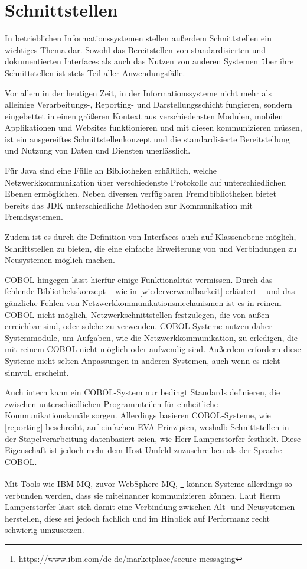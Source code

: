 \section{Schnittstellen}\label{schnittstellen}

In betrieblichen Informationssystemen stellen außerdem Schnittstellen ein wichtiges Thema dar. Sowohl das Bereitstellen von standardisierten und dokumentierten Interfaces als auch das Nutzen von anderen Systemen über ihre Schnittstellen ist stets Teil aller Anwendungsfälle. 

Vor allem in der heutigen Zeit, in der Informationssysteme nicht mehr als alleinige Verarbeitungs-, Reporting- und Darstellungsschicht fungieren, sondern eingebettet in einen größeren Kontext aus verschiedensten Modulen, mobilen Applikationen und Websites funktionieren und mit diesen kommunizieren müssen, ist ein ausgereiftes Schnittstellenkonzept und die standardisierte Bereitstellung und Nutzung von Daten und Diensten unerlässlich.

Für Java sind eine Fülle an Bibliotheken erhältlich, welche Netzwerkkommunikation über verschiedenste Protokolle auf unterschiedlichen Ebenen ermöglichen. Neben diversen verfügbaren Fremdbibliotheken bietet bereits das JDK unterschiedliche Methoden zur Kommunikation mit Fremdsystemen.

Zudem ist es durch die Definition von Interfaces auch auf Klassenebene möglich, Schnittstellen zu bieten, die eine einfache Erweiterung von und Verbindungen zu Neusystemen möglich machen.

COBOL hingegen lässt hierfür einige Funktionalität vermissen. Durch das fehlende Bibliothekskonzept -- wie in \autoref{wiederverwendbarkeit} erläutert -- und das gänzliche Fehlen von Netzwerkkommunikationsmechanismen ist es in reinem COBOL nicht möglich, Netzwerkschnittstellen festzulegen, die von außen erreichbar sind, oder solche zu verwenden. COBOL-Systeme nutzen daher \idR Systemmodule, um Aufgaben, wie die Netzwerkkommunikation, zu erledigen, die mit reinem COBOL nicht möglich oder aufwendig sind. Außerdem erfordern diese Systeme nicht selten Anpassungen in anderen Systemen, auch wenn es nicht sinnvoll erscheint.

Auch intern kann ein COBOL-System nur bedingt Standards definieren, die zwischen unterschiedlichen Programmteilen für einheitliche Kommunikationskanäle sorgen. Allerdings  basieren COBOL-Systeme, wie \autoref{reporting} beschreibt, auf einfachen EVA-Prinzipien, weshalb Schnittstellen in der Stapelverarbeitung datenbasiert seien, wie Herr Lamperstorfer festhielt. Diese Eigenschaft ist jedoch mehr dem Host-Umfeld zuzuschreiben als der Sprache COBOL.

Mit Tools wie IBM MQ, zuvor WebSphere MQ, \footnote{\url{https://www.ibm.com/de-de/marketplace/secure-messaging} \visitedOn} können Systeme allerdings so verbunden werden, dass sie miteinander kommunizieren können. Laut Herrn Lamperstorfer lässt sich damit  eine Verbindung zwischen Alt- und Neusystemen herstellen, diese sei jedoch fachlich und im Hinblick auf Performanz recht schwierig umzusetzen.